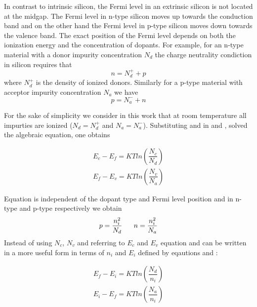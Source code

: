 In contrast to intrinsic silicon, the Fermi level in an extrinsic silicon is not located at the midgap. The Fermi level in n-type silicon moves up towards the conduction band and on the other hand the Fermi level in p-type silicon moves down towards the valence band.
The exact position of the Fermi level depends on both the ionization energy and the concentration of dopants. For example, for an n-type material with a donor impurity concentration $N_d$ the charge neutrality condiction in silicon requires that
\begin{equation}
\label{eq: equilibrium charge in n-type}
n = N_d^+ + p
\end{equation}
 where $N_d^+$ is the density of ionized donors.  Similarly for a p-type material with acceptor impurity concentration $N_a$ we have
\begin{equation}
\label{eq: equilibrium charge in p-type}
p = N_a^- + n
\end{equation}
 
 For the sake of simplicity we consider in this work that at room temperature all impurties are ionized ($N_d = N_d^+$ and $N_a = N_a^-$).
 Substituting  and  in  and , solved the algebraic equation, one obtains
 
 \begin{align}
 E_c-E_f = KTln\left(\dfrac{N_c}{N_d}\right)  \label{eq: Ef in n-type}\\
 E_f-E_v= KTln\left(\dfrac{N_v}{N_a}\right) \label{eq: Ef in p-type}
 \end{align}

Equation  is independent of the dopant type and Fermi level position and in n-type and p-type respectively we obtain
\begin{equation}
p = \dfrac{n_i^2}{N_d} \psp{10} n = \dfrac{n_i^2}{N_a}
\end{equation}
Instead of using $N_c$, $N_v$ and referring to $E_c$ and $E_v$ equation  and  can be written in a more useful form in terms of $n_i$ and $E_i$ defined by eqautions  and :

 \begin{align}
 E_f-E_i = KTln\left(\dfrac{N_d}{n_i}\right)  \label{eq: Ef in n-type Ei} \\
 E_i-E_f = KTln\left(\dfrac{N_a}{n_i}\right)  \label{eq: Ef in p-type Ei} 
 \end{align}

